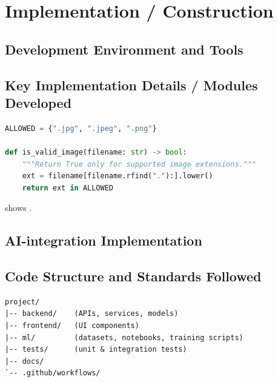 \chapter{Implementation / Construction}\label{ch:impl}

\section{Development Environment and Tools}

\section{Key Implementation Details / Modules Developed}
\begin{lstlisting}[language=Python,caption={Example: image-extension validation},label={lst:validate}]
ALLOWED = {".jpg", ".jpeg", ".png"}

def is_valid_image(filename: str) -> bool:
    """Return True only for supported image extensions."""
    ext = filename[filename.rfind("."):].lower()
    return ext in ALLOWED
\end{lstlisting}
 shows .

\section{AI-integration Implementation}

\section{Code Structure and Standards Followed}
\begin{lstlisting}[caption={Project folder structure},label={lst:tree}]
project/
|-- backend/    (APIs, services, models)
|-- frontend/   (UI components)
|-- ml/         (datasets, notebooks, training scripts)
|-- tests/      (unit & integration tests)
|-- docs/
`-- .github/workflows/
\end{lstlisting}
